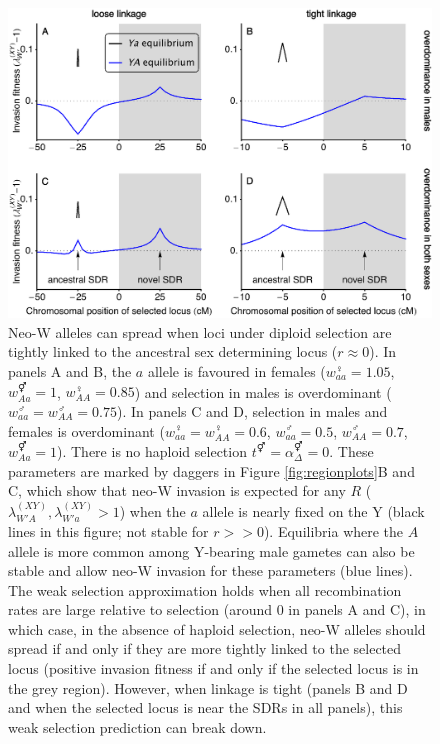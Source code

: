 \documentclass[12pt]{article}
\begin{document}
\begin{figure}[!h]
\centering
\centerline{\includegraphics[width=\linewidth]{PositionPlot_Overdominance.eps}}
\caption{
Neo-W alleles can spread when loci under diploid selection are tightly linked to the ancestral sex determining locus ($r\approx0$). 
In panels A and B, the $a$ allele is favoured in females ($w_{aa}^\female=1.05$, $w_{Aa}^\Hermaphrodite=1$, $w_{AA}^\female=0.85$) and selection in males is overdominant ($w_{aa}^\male=w_{AA}^\male=0.75$).
In panels C and D, selection in males and females is overdominant ($w_{aa}^\female=w_{AA}^\female=0.6$, $w_{aa}^\male=0.5$, $w_{AA}^\male=0.7$, $w_{Aa}^\Hermaphrodite=1$).
There is no haploid selection $t^\Hermaphrodite = \alpha^\Hermaphrodite_\Delta = 0$.
These parameters are marked by daggers in Figure \ref{fig:regionplots}B and C, which show that neo-W invasion is expected for any $R$ ($\lambda_{W'A}^{(XY)},\lambda_{W'a}^{(XY)}>1$) when the $a$ allele is nearly fixed on the Y (black lines in this figure; not stable for $r>>0$). 
Equilibria where the $A$ allele is more common among Y-bearing male gametes can also be stable and allow neo-W invasion for these parameters (blue lines). 
The weak selection approximation holds when all recombination rates are large relative to selection (around 0 in panels A and C), in which case, in the absence of haploid selection, neo-W alleles should spread if and only if they are more tightly linked to the selected locus (positive invasion fitness if and only if the selected locus is in the grey region). 
However, when linkage is tight (panels B and D and when the selected locus is near the SDRs in all panels), this weak selection prediction can break down. 
}
\label{fig:positionOverdominance}
\end{figure}
\end{document}
